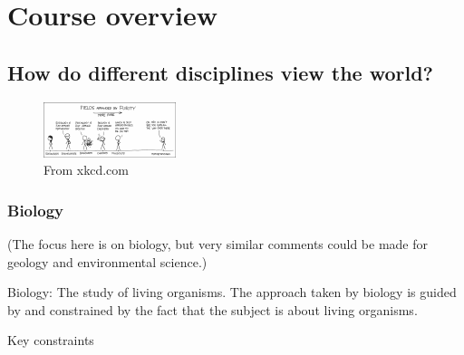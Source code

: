\section{Course overview}

\subsection{How do different disciplines view the world?}

\begin{figure}[h]
  \includegraphics[width=\textwidth]{./figs/purity.pdf}
  \caption{From xkcd.com}
\end{figure}


\subsubsection{Biology}

(The focus here is on biology, but very similar comments could be made for geology and environmental science.)

Biology: The study of living organisms. The approach taken by biology is guided by and constrained by the fact that the subject is about living organisms.

Key constraints

